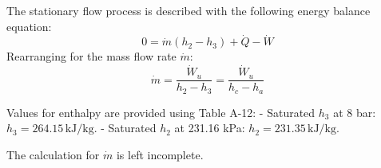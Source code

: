 The stationary flow process is described with the following energy balance equation:  
\[
0 = \dot{m} (h_2 - h_3) + \dot{Q} - \dot{W}
\]  
Rearranging for the mass flow rate \( \dot{m} \):  
\[
\dot{m} = \frac{\dot{W}_u}{h_2 - h_3} = \frac{\dot{W}_u}{h_c - h_a}
\]  

Values for enthalpy are provided using Table A-12:  
- Saturated \( h_3 \) at 8 bar: \( h_3 = 264.15 \, \text{kJ/kg} \).  
- Saturated \( h_2 \) at 231.16 kPa: \( h_2 = 231.35 \, \text{kJ/kg} \).  

The calculation for \( \dot{m} \) is left incomplete.